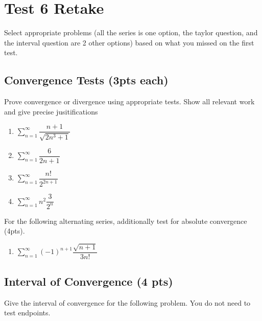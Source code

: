 \documentclass[
]{article}
\author{}
\date{}
\providecommand{\tightlist}{%
  \setlength{\itemsep}{0pt}\setlength{\parskip}{0pt}}
\begin{document}
\hypertarget{test-6-retake}{%
\section{Test 6 Retake}\label{test-6-retake}}
\pagestyle{empty}
Select appropriate problems (all the series is one option, the taylor
question, and the interval question are 2 other options) based on what
you missed on the first test.

\hypertarget{convergence-tests-3pts-each}{%
\subsection{Convergence Tests (3pts
each)}\label{convergence-tests-3pts-each}}

Prove convergence or divergence using appropriate tests. Show all
relevant work and give precise jusitifications

\begin{enumerate}
\def\labelenumi{\arabic{enumi}.}
\setlength{\itemsep}{1.5in}
\item
  \(\displaystyle \sum_{n=1}^\infty \dfrac{n+1}{\sqrt{2n^3+1}}\)
\item
  \(\displaystyle \sum_{n=1}^\infty \dfrac{6}{2n+1}\)
\item
  \(\displaystyle \sum_{n=1}^\infty \dfrac{n!}{2^{2n+1}}\)
\item
  \(\displaystyle \sum_{n=1}^\infty n^2\dfrac{3}{2^n}\)
\end{enumerate}
\vspace{1.5in*}

For the following alternating series, additionally test for absolute
convergence (4pts).

\begin{enumerate}
\def\labelenumi{\arabic{enumi}.}
\setcounter{enumi}{4}
\tightlist
\item
  \(\displaystyle \sum_{n=1}^\infty (-1)^{n+1}\dfrac{\sqrt{n+1}}{3n!}\)
\end{enumerate}
\vspace{1.5in*}

\hypertarget{interval-of-convergence-4-pts}{%
\subsection{Interval of Convergence (4
pts)}\label{interval-of-convergence-4-pts}}

Give the interval of convergence for the following problem. You do not
need to test endpoints.
\end{document}
